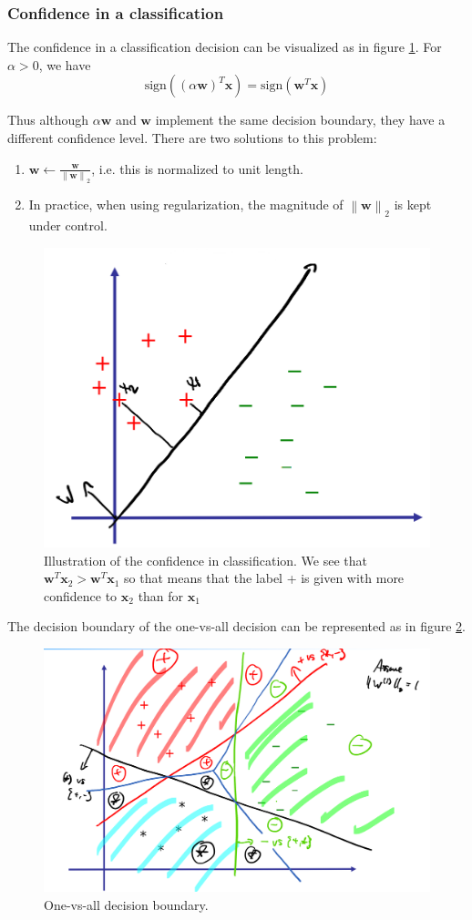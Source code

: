 \documentclass[a4paper,10pt,twoside]{article}
\newcommand\norm[1]{\left\lVert#1\right\rVert}
\begin{document}
\subsubsection{Confidence in a classification}

The confidence in a classification decision can be visualized as in figure \ref{confidence-in-classification}. For $\alpha>0$, we have
\begin{equation*}
    \text{sign}((\alpha\mathbf{w})^T\mathbf{x})=\text{sign}(\mathbf{w}^T\mathbf{x})
\end{equation*}

Thus although $\alpha\mathbf{w}$ and $\mathbf{w}$ implement the same decision boundary, they have a different confidence level. There are two solutions to this problem:
\begin{enumerate}
    \item $\mathbf{w}\leftarrow \frac{\mathbf{w}}{\norm{\mathbf{w}}_2}$, i.e. this is normalized to unit length.
    \item In practice, when using regularization, the magnitude of $\norm{\mathbf{w}}_2$ is kept under control.
\end{enumerate}

\begin{figure}
    \centering
    \includegraphics[width=.5\textwidth]{figures/confidence-in-classification.png}
    \caption{Illustration of the confidence in classification. We see that $\mathbf{w}^T\mathbf{x}_2>\mathbf{w}^T\mathbf{x}_1$ so that means that the label + is given with more confidence to $\mathbf{x}_2$ than for $\mathbf{x}_1$}
    \label{confidence-in-classification}
\end{figure}

The decision boundary of the one-vs-all decision can be represented as in figure \ref{ova-decision-boundary}.

\begin{figure}
    \centering
    \includegraphics[width=.5\textwidth]{figures/ova-decision-boundary.png}
    \caption{One-vs-all decision boundary.}
    \label{ova-decision-boundary}
\end{figure}
\end{document}
